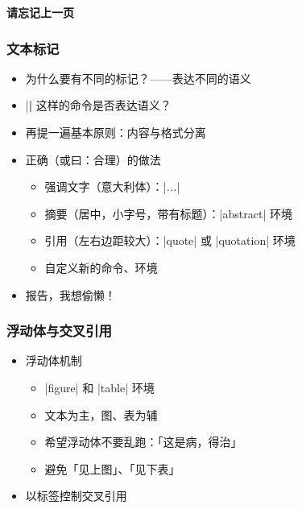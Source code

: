 \begin{frame}[standout]
  \huge \textbf{请忘记上一页}
\end{frame}

\begin{frame}[fragile]
\frametitle{文本标记}
\begin{itemize}
  \item 为什么要有不同的标记？\pause\mbox{}——表达不同的\alert{语义} \pause
  \item |\textbf| 这样的命令是否表达语义？ \pause
  \item 再提一遍基本原则：\alert{内容与格式分离} \pause
  \item 正确（或曰：合理）的做法

    \begin{itemize}
      \item 强调文字（意大利体）：|\emph{...}|
      \item 摘要（居中，小字号，带有标题）：|abstract| 环境
      \item 引用（左右边距较大）：|quote| 或 |quotation| 环境
      \item 自定义新的命令、环境
    \end{itemize} \pause

  \item 报告，我想偷懒！
\end{itemize}
\end{frame}

\begin{frame}[fragile]
\frametitle{浮动体与交叉引用}
\begin{itemize}
  \item<+-> 浮动体机制

    \begin{itemize}
      \item |figure| 和 |table| 环境
      \item 文本为主，图、表为辅
      \item 希望浮动体不要乱跑：「这是病，得治」
      \item 避免「见上图」、「见下表」
    \end{itemize}

  \item<+-> 以标签控制交叉引用

\end{itemize}
\end{frame}

